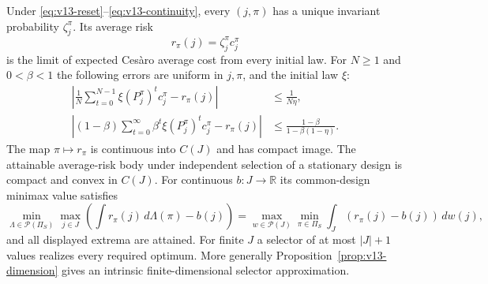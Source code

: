 \begin{theorem}\label{thm:v13-average}
Under \eqref{eq:v13-reset}--\eqref{eq:v13-continuity}, every $(j,\pi)$
has a unique invariant probability $\zeta_j^\pi$. Its average risk
\[
 r_\pi(j)=\zeta_j^\pi c_j^\pi
\]
is the limit of expected Ces\`aro average cost from every initial law.
For $N\ge1$ and $0<\beta<1$ the following errors are uniform in
$j,\pi$, and the initial law $\xi$:
\begin{align}
 \left|\frac1N\sum_{t=0}^{N-1}\xi(P_j^\pi)^tc_j^\pi-r_\pi(j)\right|
 &\le\frac1{N\eta},\label{eq:v13-cesaro}\\
 \left|(1-\beta)\sum_{t=0}^\infty\beta^t
              \xi(P_j^\pi)^tc_j^\pi-r_\pi(j)\right|
 &\le\frac{1-\beta}{1-\beta(1-\eta)}.\label{eq:v13-discount}
\end{align}
The map $\pi\mapsto r_\pi$ is continuous into $C(J)$ and has compact
image. The attainable average-risk body under independent selection
of a stationary design is compact and convex in $C(J)$. For continuous
$b:J\to\mathbb R$ its common-design minimax value satisfies
\begin{equation}\label{eq:v13-average-dual}
 \min_{\Lambda\in\mathcal P(\Pi_S)}\max_{j\in J}
       \left(\int r_\pi(j)\,d\Lambda(\pi)-b(j)\right)
 =\max_{w\in\mathcal P(J)}\min_{\pi\in\Pi_S}
       \int_J(r_\pi(j)-b(j))\,dw(j),
\end{equation}
and all displayed extrema are attained. For finite $J$ a selector of
at most $|J|+1$ values realizes every required optimum. More generally
Proposition~\ref{prop:v13-dimension} gives an intrinsic finite-dimensional
selector approximation.
\end{theorem}
